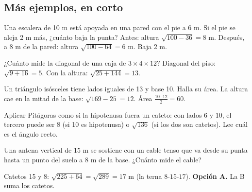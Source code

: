 \subsection{Más ejemplos, en corto}
\begin{ejemplo}
Una escalera de 10 m está apoyada en una pared con el pie a 6 m. Si el pie se aleja 2 m más, ¿cuánto baja la punta?
\solucion Antes: altura $\sqrt{100 - 36} = 8$ m. Después, a 8 m de la pared: altura $\sqrt{100 - 64} = 6$ m. Baja 2 m.
\end{ejemplo}

\begin{ejemplo}
¿Cuánto mide la diagonal de una caja de $3 \times 4 \times 12$?
\solucion Diagonal del piso: $\sqrt{9 + 16} = 5$. Con la altura: $\sqrt{25 + 144} = 13$.
\end{ejemplo}

\begin{ejemplo}
Un triángulo isósceles tiene lados iguales de 13 y base 10. Halla su área.
\solucion La altura cae en la mitad de la base: $\sqrt{169 - 25} = 12$. Área $\tfrac{10 \cdot 12}{2} = 60$.
\end{ejemplo}

\begin{trampa}
Aplicar Pitágoras como si la hipotenusa fuera un cateto: con lados 6 y 10, el tercero puede ser 8 (si 10 es hipotenusa)
o $\sqrt{136}$ (si los dos son catetos). Lee cuál es el ángulo recto.
\end{trampa}

\begin{reto}
Una antena vertical de 15 m se sostiene con un cable tenso que va desde su punta hasta un punto del suelo a 8 m de la
base. ¿Cuánto mide el cable?
\end{reto}

\begin{retoresuelto}
Catetos 15 y 8: $\sqrt{225 + 64} = \sqrt{289} = 17$ m (la terna $8$-$15$-$17$). \textbf{Opción A.} La B suma los catetos.
\end{retoresuelto}

